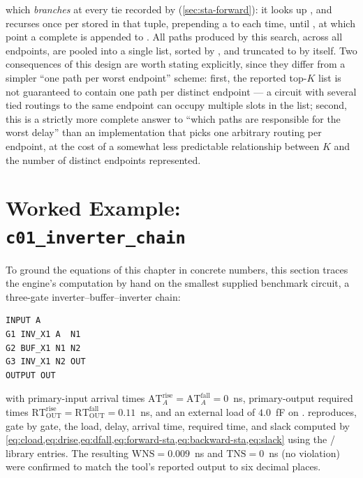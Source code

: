which \emph{branches} at every tie recorded by 
(\cref{sec:sta-forward}): it looks up , and recurses once per stored 
in that tuple, prepending a  to
 each time, until , at which point a complete  is appended to . All paths produced by this
search, across all endpoints, are pooled into a single list, sorted by
, and truncated to
 by
 itself. Two consequences of this design are
worth stating explicitly, since they differ from a simpler ``one path per
worst endpoint'' scheme: first, the reported top-$K$ list is not guaranteed
to contain one path per distinct endpoint --- a circuit with several tied
routings to the same endpoint can occupy multiple slots in the list; second,
this is a strictly more complete answer to ``which paths are responsible
for the worst delay'' than an implementation that picks one arbitrary
routing per endpoint, at the cost of a somewhat less predictable
relationship between $K$ and the number of distinct endpoints represented.

\section{Worked Example: \texttt{c01\_inverter\_chain}}
\label{sec:sta-worked-example}

To ground the equations of this chapter in concrete numbers, this section
traces the engine's computation by hand on the smallest supplied benchmark
circuit, a three-gate inverter--buffer--inverter chain:

\begin{lstlisting}[language=bash, style=pythonstyle, numbers=none]
INPUT A
G1 INV_X1 A  N1
G2 BUF_X1 N1 N2
G3 INV_X1 N2 OUT
OUTPUT OUT
\end{lstlisting}

with primary-input arrival times $\mathrm{AT}_A^{\mathrm{rise}} =
\mathrm{AT}_A^{\mathrm{fall}} = 0$~ns, primary-output required times
$\mathrm{RT}_{\mathrm{OUT}}^{\mathrm{rise}} =
\mathrm{RT}_{\mathrm{OUT}}^{\mathrm{fall}} = 0.11$~ns, and an external load
of $4.0$~fF on .  reproduces, gate by gate,
the load, delay, arrival time, required time, and slack computed by
\cref{eq:cload,eq:drise,eq:dfall,eq:forward-sta,eq:backward-sta,eq:slack}
using the / library entries. The resulting
$\mathrm{WNS} = 0.009$~ns and $\mathrm{TNS} = 0$~ns (no violation) were
confirmed to match the tool's reported output to six decimal places.

